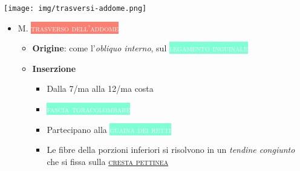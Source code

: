 \documentclass[italian,]{article}
\providecommand{\tightlist}{%
  \setlength{\itemsep}{0pt}\setlength{\parskip}{0pt}}
\newcommand{\mus}[1]{\colorbox{Salmon}{\textcolor{white}{\textsc{#1}}}}
\newcommand{\tol}[1]{\colorbox{Aquamarine}{\textcolor{white}{\textsc{#1}}}}
\renewcommand{\a}[1]{\underline{\textsc{#1}}}
\begin{document}
\texttt{[image: img/trasversi-addome.png]}~

\begin{itemize}
\tightlist
\item
  M. \mus{trasverso dell'addome}~

  \begin{itemize}
  \tightlist
  \item
    \textbf{Origine}: come l'\emph{obliquo interno}, sul
    \tol{legamento inguinale}
  \item
    \textbf{Inserzione}

    \begin{itemize}
    \item
      Dalla 7/ma alla 12/ma costa
    \item
      \tol{fascia toracolombare}
    \item
      Partecipano alla \tol{guaina dei retti}
    \item
      Le fibre della porzioni inferiori si risolvono in un \emph{tendine
      congiunto} che si fissa sulla \a{cresta pettinea}
    \end{itemize}
  \end{itemize}
\end{itemize}
\end{document}
